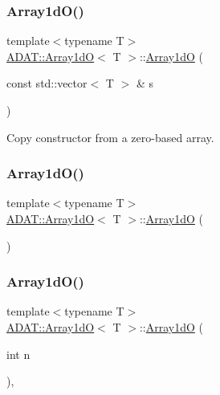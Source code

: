 \subsubsection{\texorpdfstring{Array1dO()}{Array1dO()}\hspace{0.1cm}{\footnotesize\ttfamily [10/15]}}
{\footnotesize\ttfamily template$<$typename T$>$ \\
\mbox{\hyperlink{classADAT_1_1Array1dO}{A\+D\+A\+T\+::\+Array1dO}}$<$ T $>$\+::\mbox{\hyperlink{classADAT_1_1Array1dO}{Array1dO}} (\begin{DoxyParamCaption}\item[{const std\+::vector$<$ T $>$ \&}]{s }\end{DoxyParamCaption})\hspace{0.3cm}{\ttfamily [inline]}}



Copy constructor from a zero-\/based array. 

\mbox{\label{classADAT_1_1Array1dO_af55d30db029bb654a123544dfc155e6a}} 
\subsubsection{\texorpdfstring{Array1dO()}{Array1dO()}\hspace{0.1cm}{\footnotesize\ttfamily [11/15]}}
{\footnotesize\ttfamily template$<$typename T$>$ \\
\mbox{\hyperlink{classADAT_1_1Array1dO}{A\+D\+A\+T\+::\+Array1dO}}$<$ T $>$\+::\mbox{\hyperlink{classADAT_1_1Array1dO}{Array1dO}} (\begin{DoxyParamCaption}{ }\end{DoxyParamCaption})\hspace{0.3cm}{\ttfamily [inline]}}

\mbox{\label{classADAT_1_1Array1dO_abd486987192b85b2cd27fd28660168bf}} 
\subsubsection{\texorpdfstring{Array1dO()}{Array1dO()}\hspace{0.1cm}{\footnotesize\ttfamily [12/15]}}
{\footnotesize\ttfamily template$<$typename T$>$ \\
\mbox{\hyperlink{classADAT_1_1Array1dO}{A\+D\+A\+T\+::\+Array1dO}}$<$ T $>$\+::\mbox{\hyperlink{classADAT_1_1Array1dO}{Array1dO}} (\begin{DoxyParamCaption}\item[{int}]{n }\end{DoxyParamCaption})\hspace{0.3cm}{\ttfamily [inline]}, {\ttfamily [explicit]}}

